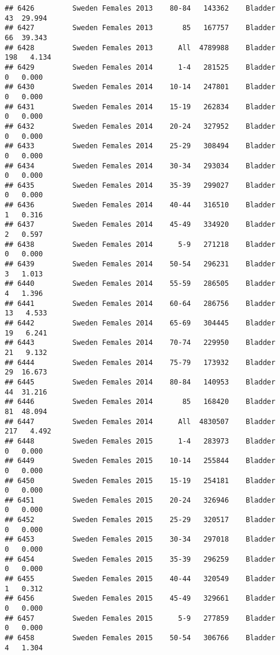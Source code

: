 \documentclass[
]{article}
\begin{document}
\begin{verbatim}
## 6426         Sweden Females 2013    80-84   143362    Bladder     43  29.994
## 6427         Sweden Females 2013       85   167757    Bladder     66  39.343
## 6428         Sweden Females 2013      All  4789988    Bladder    198   4.134
## 6429         Sweden Females 2014      1-4   281525    Bladder      0   0.000
## 6430         Sweden Females 2014    10-14   247801    Bladder      0   0.000
## 6431         Sweden Females 2014    15-19   262834    Bladder      0   0.000
## 6432         Sweden Females 2014    20-24   327952    Bladder      0   0.000
## 6433         Sweden Females 2014    25-29   308494    Bladder      0   0.000
## 6434         Sweden Females 2014    30-34   293034    Bladder      0   0.000
## 6435         Sweden Females 2014    35-39   299027    Bladder      0   0.000
## 6436         Sweden Females 2014    40-44   316510    Bladder      1   0.316
## 6437         Sweden Females 2014    45-49   334920    Bladder      2   0.597
## 6438         Sweden Females 2014      5-9   271218    Bladder      0   0.000
## 6439         Sweden Females 2014    50-54   296231    Bladder      3   1.013
## 6440         Sweden Females 2014    55-59   286505    Bladder      4   1.396
## 6441         Sweden Females 2014    60-64   286756    Bladder     13   4.533
## 6442         Sweden Females 2014    65-69   304445    Bladder     19   6.241
## 6443         Sweden Females 2014    70-74   229950    Bladder     21   9.132
## 6444         Sweden Females 2014    75-79   173932    Bladder     29  16.673
## 6445         Sweden Females 2014    80-84   140953    Bladder     44  31.216
## 6446         Sweden Females 2014       85   168420    Bladder     81  48.094
## 6447         Sweden Females 2014      All  4830507    Bladder    217   4.492
## 6448         Sweden Females 2015      1-4   283973    Bladder      0   0.000
## 6449         Sweden Females 2015    10-14   255844    Bladder      0   0.000
## 6450         Sweden Females 2015    15-19   254181    Bladder      0   0.000
## 6451         Sweden Females 2015    20-24   326946    Bladder      0   0.000
## 6452         Sweden Females 2015    25-29   320517    Bladder      0   0.000
## 6453         Sweden Females 2015    30-34   297018    Bladder      0   0.000
## 6454         Sweden Females 2015    35-39   296259    Bladder      0   0.000
## 6455         Sweden Females 2015    40-44   320549    Bladder      1   0.312
## 6456         Sweden Females 2015    45-49   329661    Bladder      0   0.000
## 6457         Sweden Females 2015      5-9   277859    Bladder      0   0.000
## 6458         Sweden Females 2015    50-54   306766    Bladder      4   1.304

\end{verbatim}
\end{document}
